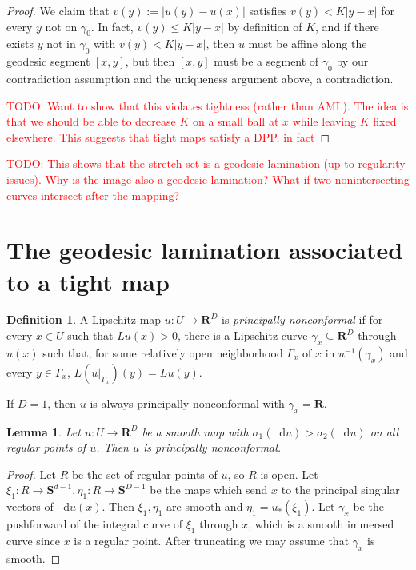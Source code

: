 \documentclass[reqno,11pt]{amsart}
\newcommand{\RR}{\mathbf{R}}
\newcommand{\Sph}{\mathbf S}
\newcommand*\dif{\mathop{}\!\mathrm{d}}
\newcommand{\dfn}[1]{\emph{#1}\index{#1}}
\newtheorem{lemma}[theorem]{Lemma}
\theoremstyle{definition}
\newtheorem{definition}[theorem]{Definition}
\numberwithin{equation}{section}
\newcommand\todo[1]{\textcolor{red}{TODO: #1}}
\begin{document}
\begin{proof}
We claim that $v(y) := |u(y) - u(x)|$ satisfies $v(y) < K|y - x|$ for every $y$ not on $\gamma_0$.
In fact, $v(y) \leq K|y - x|$ by definition of $K$, and if there exists $y$ not in $\gamma_0$ with $v(y) < K|y - x|$, then $u$ must be affine along the geodesic segment $[x, y]$, but then $[x, y]$ must be a segment of $\gamma_0$ by our contradiction assumption and the uniqueness argument above, a contradiction.

\todo{Want to show that this violates tightness (rather than AML).
The idea is that we should be able to decrease $K$ on a small ball at $x$ while leaving $K$ fixed elsewhere.
This suggests that tight maps satisfy a DPP, in fact}
\end{proof}

\todo{This shows that the stretch set is a geodesic lamination (up to regularity issues).
Why is the image also a geodesic lamination? What if two nonintersecting curves intersect after the mapping?}


\section{The geodesic lamination associated to a tight map}
\begin{definition}
A Lipschitz map $u: U \to \RR^D$ is \dfn{principally nonconformal} if for every $x \in U$ such that $Lu(x) > 0$, there is a Lipschitz curve $\gamma_x \subseteq \RR^D$ through $u(x)$ such that, for some relatively open neighborhood $\Gamma_x$ of $x$ in $u^{-1}(\gamma_x)$ and every $y \in \Gamma_x$, $L(u|_{\Gamma_x})(y) = Lu(y)$.
\end{definition}

If $D = 1$, then $u$ is always principally nonconformal with $\gamma_x = \RR$.

\begin{lemma}
Let $u: U \to \RR^D$ be a smooth map with $\sigma_1(\dif u) > \sigma_2(\dif u)$ on all regular points of $u$.
Then $u$ is principally nonconformal.
\end{lemma}
\begin{proof}
Let $R$ be the set of regular points of $u$, so $R$ is open.
Let $\xi_1: R \to \Sph^{d - 1}, \eta_1: R \to \Sph^{D - 1}$ be the maps which send $x$ to the principal singular vectors of $\dif u(x)$.
Then $\xi_1, \eta_1$ are smooth and $\eta_1 = u_*(\xi_1)$.
Let $\gamma_x$ be the pushforward of the integral curve of $\xi_1$ through $x$, which is a smooth immersed curve since $x$ is a regular point.
After truncating we may assume that $\gamma_x$ is smooth.

\end{proof}
\end{document}
